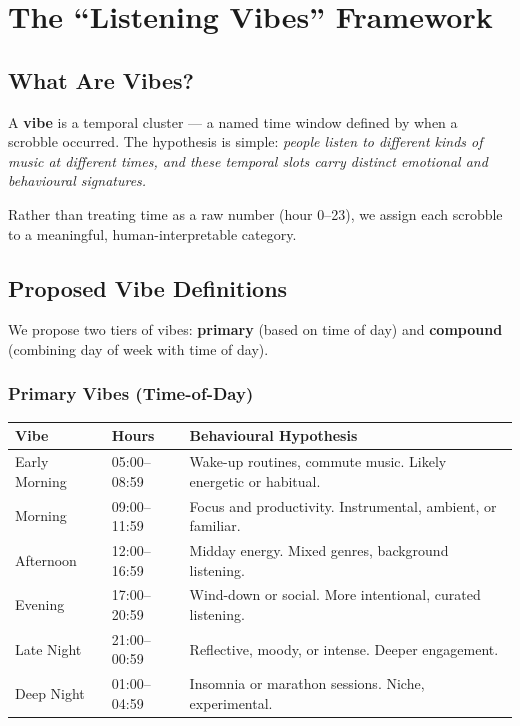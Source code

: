 \documentclass[12pt, a4paper]{article}
\begin{document}
\section{The ``Listening Vibes'' Framework}

\subsection{What Are Vibes?}

A \textbf{vibe} is a temporal cluster --- a named time window defined by
when a scrobble occurred. The hypothesis is simple: \emph{people listen to
different kinds of music at different times, and these temporal slots carry
distinct emotional and behavioural signatures.}

Rather than treating time as a raw number (hour 0--23), we assign each
scrobble to a meaningful, human-interpretable category.

\subsection{Proposed Vibe Definitions}

We propose two tiers of vibes: \textbf{primary} (based on time of day) and
\textbf{compound} (combining day of week with time of day).

\subsubsection{Primary Vibes (Time-of-Day)}

\begin{center}
\begin{tabular}{llp{6.5cm}}
    \toprule
    \textbf{Vibe} & \textbf{Hours} & \textbf{Behavioural Hypothesis} \\
    \midrule
    Early Morning  & 05:00--08:59 & Wake-up routines, commute music.
                                    Likely energetic or habitual. \\
    Morning        & 09:00--11:59 & Focus and productivity.
                                    Instrumental, ambient, or familiar. \\
    Afternoon      & 12:00--16:59 & Midday energy. Mixed genres,
                                    background listening. \\
    Evening        & 17:00--20:59 & Wind-down or social.
                                    More intentional, curated listening. \\
    Late Night     & 21:00--00:59 & Reflective, moody, or intense.
                                    Deeper engagement. \\
    Deep Night     & 01:00--04:59 & Insomnia or marathon sessions.
                                    Niche, experimental. \\
    \bottomrule
\end{tabular}
\end{center}
\end{document}
